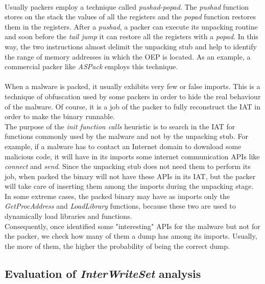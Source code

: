 \paragraph{}
Usually packers employ a technique called \textit{pushad-popad}. The \textit{pushad} function stores on the stack the values of all the registers and the \textit{popad} function restores them in the registers. After a \textit{pushad}, a packer can execute its unpacking routine and soon before the \textit{tail jump} it can restore all the registers with a \textit{popad}. In this way, the two instructions almost delimit the unpacking stub and help to identify the range of memory addresses in which the \ac{OEP} is located. As an example, a commercial packer like \textit{ASPack} employs this technique.
\paragraph{}
When a malware is packed, it usually exhibits very few or false imports. This is a technique of obfuscation used by some packers in order to hide the real behaviour of the malware. Of course, it is a job of the packer to fully reconstruct the \ac{IAT} in order to make the binary runnable.\\
The purpose of the \textit{init function calls} heuristic is to search in the \ac{IAT} for functions commonly used by the malware and not by the unpacking stub. For example, if a malware has to contact an Internet domain to download some malicious code, it will have in its imports some internet communication \acp{API} like \textit{connect} and \textit{send}. Since the unpacking stub does not need them to perform its job, when packed the binary will not have these \acp{API} in its \ac{IAT}, but the packer will take care of inserting them among the imports during the unpacking stage. In some extreme cases, the packed binary may have as imports only the \textit{GetProcAddress} and \textit{LoadLibrary} functions, because these two are used to dynamically load libraries and functions.\\
Consequently, once identified some "interesting" \acp{API} for the malware but not for the packer, we check how many of them a dump has among its imports. Usually, the more of them, the higher the probability of being the correct dump.
\paragraph{}
\subsection{Evaluation of \textit{InterWriteSet} analysis}
